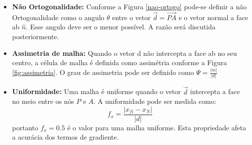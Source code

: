 \begin{itemize}
    \item \textbf{Não Ortogonalidade:} Conforme a Figura \ref{nao-ortogo} pode-se definir a não Ortogonalidade como o angulo $\theta$ entre o vetor $\vec{d}=\vec{PA}$ e o vetor normal a face ab $\hat{n}$. Esse angulo deve ser o menor possível. A razão será discutida posteriormente.
    \item \textbf{Assimetria de malha:} Quando o vetor d não intercepta a face ab no seu centro, a célula de malha é definida como assimétria conforme a Figura \ref{fig:assimetria}. O grau de assimetria pode ser definido como $\Psi = \frac{|m|}{|d|}$
    \item \textbf{Uniformidade:}  Uma malha é uniforme quando o vetor $\vec{d}$ intercepta a face no meio entre os nós $P$ e $A$. A uniformidade pode ser medida como:
    \begin{equation*}
        f_x = \frac{|x_{fi}-x_N|}{|d|}
    \end{equation*}
    portanto $f_x=0.5$ é o valor para uma malha uniforme. Esta propriedade afeta a acurácia dos termos de gradiente.
\end{itemize}

